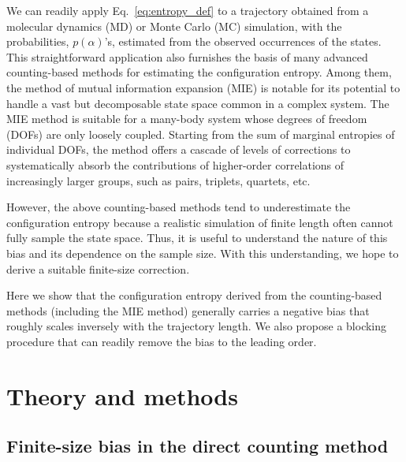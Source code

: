 \documentclass[reprint, superscriptaddress]{revtex4-1}
\begin{document}
We can readily apply Eq.~\eqref{eq:entropy_def} to a trajectory
obtained from a molecular dynamics (MD) or Monte Carlo (MC) simulation,
with the probabilities, $p(\alpha)$'s,
estimated from the observed occurrences of the states.
%
This straightforward application also furnishes the basis
of many advanced counting-based methods for estimating the configuration entropy\cite{hnizdo2007, killian2007}.
%
Among them, the method of mutual information expansion (MIE)\cite{killian2007} is notable
for its potential to handle a vast but decomposable state space common in a complex system.
%
The MIE method is suitable for a many-body system
whose degrees of freedom (DOFs) are only loosely coupled.
%
Starting from the sum of marginal entropies of individual DOFs,
the method offers a cascade of levels of corrections
to systematically absorb the contributions of higher-order correlations
of increasingly larger groups, such as pairs, triplets, quartets, etc.

However, the above counting-based methods
tend to underestimate the configuration entropy
because a realistic simulation of finite length
often cannot fully sample the state space.
%
Thus, it is useful to understand the nature of this bias
and its dependence on the sample size.
%
With this understanding,
we hope to derive a suitable finite-size correction.

Here we show that the configuration entropy derived
from the counting-based methods (including the MIE method)
generally carries a negative bias
that roughly scales inversely with the trajectory length.
%
We also propose a blocking procedure
that can readily remove the bias
to the leading order.
%
%



\section{Theory and methods}

\subsection{\label{sec:fsbias}
Finite-size bias in the direct counting method}
\end{document}
